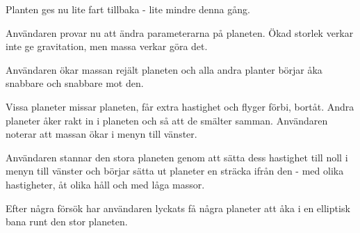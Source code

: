 Planten ges nu lite fart tillbaka - lite mindre denna gång.

Användaren provar nu att ändra parameterarna på planeten.
Ökad storlek verkar inte ge gravitation, men massa verkar göra det.

Användaren ökar massan rejält planeten och alla andra planter börjar
åka snabbare och snabbare mot den.

Vissa planeter missar planeten, får extra hastighet och flyger förbi, bortåt.
Andra planeter åker rakt in i planeten och så att de smälter samman.
Användaren noterar att massan ökar i menyn till vänster.

Användaren stannar den stora planeten genom att sätta dess hastighet till
noll i menyn till vänster och
börjar sätta ut planeter en sträcka ifrån den
- med olika hastigheter, åt olika håll och med låga massor.

Efter några försök har användaren lyckats få några planeter att åka i en
elliptisk bana runt den stor planeten.
